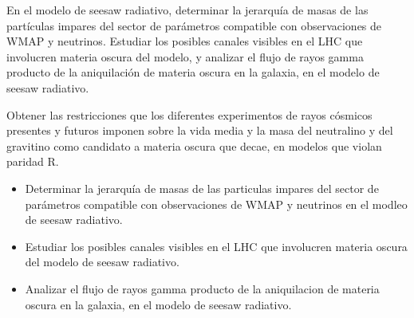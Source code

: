 En el modelo de seesaw radiativo, determinar la jerarquía de masas de las partículas impares del sector de parámetros compatible con observaciones de WMAP y neutrinos. Estudiar los posibles canales visibles en el LHC que involucren materia oscura del modelo, y analizar el flujo de rayos gamma producto de la aniquilación de materia oscura en la galaxia, en el modelo de seesaw radiativo.

Obtener las restricciones que los diferentes experimentos de rayos cósmicos 
presentes y futuros imponen sobre la vida media y la masa del neutralino y del gravitino como 
candidato a materia oscura que decae, en modelos que violan paridad R.


\begin{itemize}
 \item Determinar la jerarquía de masas de las particulas impares del sector de parámetros compatible con observaciones de WMAP y neutrinos en el modleo de seesaw radiativo.
 \item Estudiar los posibles canales visibles en el LHC que involucren materia oscura del modelo de seesaw radiativo.
 \item Analizar el flujo de rayos gamma producto de la aniquilacion de materia oscura en la galaxia, en el modelo de seesaw radiativo.
\end{itemize}

